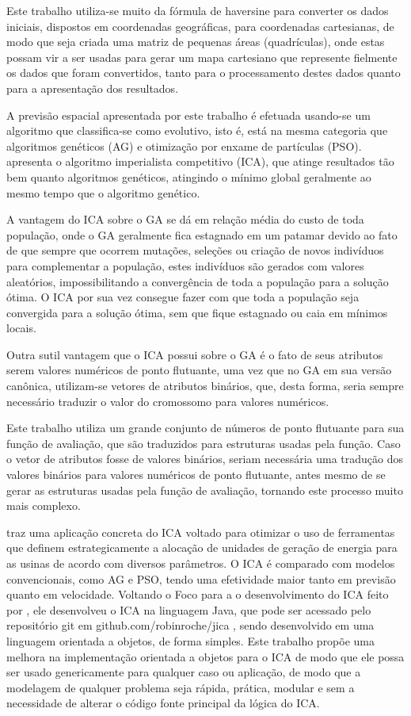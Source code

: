 Este trabalho utiliza-se muito da fórmula de haversine para converter os dados iniciais, dispostos em coordenadas geográficas, para coordenadas cartesianas, de modo que seja criada uma matriz de pequenas áreas (quadrículas), onde estas possam vir a ser usadas para gerar um mapa cartesiano que represente fielmente os dados que foram convertidos, tanto para o processamento destes dados quanto para a apresentação dos resultados.

A previsão espacial apresentada por este trabalho é efetuada usando-se um algoritmo que classifica-se como evolutivo, isto é, está na mesma categoria que  algoritmos genéticos (AG) \cite{mitchell1998introduction} e otimização por enxame de partículas (PSO). \cite{atashpaz2007imperialist} apresenta o algoritmo imperialista competitivo (ICA), que atinge resultados tão bem quanto algoritmos genéticos, atingindo o mínimo global geralmente ao mesmo tempo que o algoritmo genético. 

A vantagem do ICA sobre o GA se dá em relação média do custo de toda população, onde o GA geralmente fica estagnado em um patamar devido ao fato de que sempre que ocorrem mutações, seleções ou criação de novos indivíduos para complementar a população, estes indivíduos são gerados com valores aleatórios, impossibilitando a convergência de toda a população para a solução ótima. O ICA por sua vez consegue fazer com que toda a população seja convergida para a solução ótima, sem que fique estagnado ou caia em mínimos locais.  

Outra sutil vantagem que o ICA possui sobre o GA é o fato de seus atributos serem valores numéricos de ponto flutuante, uma vez que no GA em sua versão canônica, utilizam-se vetores de atributos binários, que, desta forma, seria sempre necessário traduzir o valor do cromossomo para valores numéricos. 

Este trabalho utiliza um grande conjunto de números de ponto flutuante para sua função de avaliação, que são traduzidos para estruturas usadas pela função. Caso o vetor de atributos fosse de valores binários, seriam necessária uma tradução dos valores binários para valores numéricos de ponto flutuante, antes mesmo de se gerar as estruturas usadas pela função de avaliação, tornando este processo muito mais complexo.

\cite{roche2011imperialist} traz uma aplicação concreta do ICA voltado para otimizar o uso de ferramentas que definem estrategicamente a alocação de unidades de geração de energia para as usinas de acordo com diversos parâmetros. O ICA é comparado com modelos convencionais, como AG e PSO, tendo uma efetividade maior tanto em previsão quanto em velocidade. Voltando o Foco para a o desenvolvimento do ICA feito por \citeauthor{roche2011imperialist}, ele desenvolveu o ICA na linguagem Java, que pode ser acessado pelo repositório git em github.com/robinroche/jica \cite{jica}, sendo desenvolvido em uma linguagem orientada a objetos, de forma simples. Este trabalho propõe uma melhora na implementação orientada a objetos para o ICA de modo que ele possa ser usado genericamente para qualquer caso ou aplicação, de modo que a modelagem de qualquer problema seja rápida, prática, modular e sem a necessidade de alterar o código fonte principal da lógica do ICA. 

